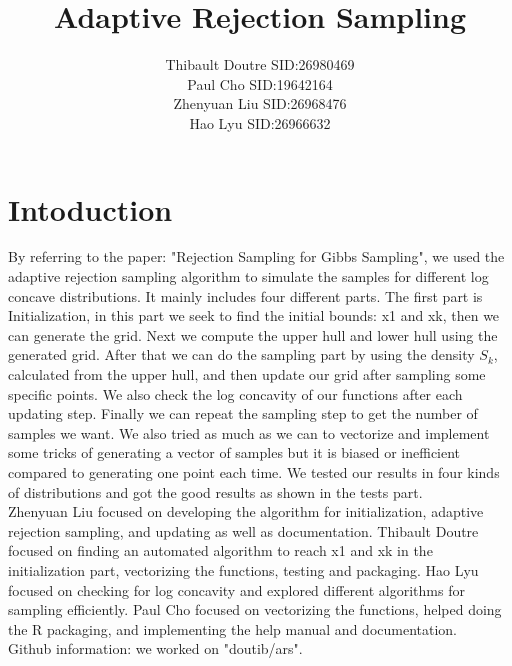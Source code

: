 \documentclass{llncs}\usepackage[]{graphicx}\usepackage[]{color}
\begin{document}
\title{Adaptive Rejection Sampling}
\author{
Thibault Doutre SID:26980469\\
Paul Cho SID:19642164\\
Zhenyuan Liu SID:26968476\\
Hao Lyu SID:26966632}
\maketitle
\section{Intoduction}
By referring to the paper: "Rejection Sampling for Gibbs Sampling", we used the adaptive rejection sampling algorithm to simulate the samples for different log concave distributions. It mainly includes four different parts. The first part is Initialization, in this part we seek to find the initial bounds: x1 and xk, then we can generate the grid. Next we compute the upper hull and lower hull using the generated grid. After that we can do the sampling part by using the density $S_k$, calculated from the upper hull, and then update our grid after sampling some specific points. We also check the log concavity of our functions after each updating step. Finally we can repeat the sampling step to get the number of samples we want. We also tried as much as we can to vectorize and implement some tricks of generating a vector of samples but it is biased or inefficient compared to generating one point each time. We tested our results in four kinds of distributions and got the good results as shown in the tests part.\\
Zhenyuan Liu focused on developing the algorithm for initialization, adaptive rejection sampling, and updating as well as documentation. Thibault Doutre focused on finding an automated algorithm to reach x1 and xk in the initialization part, vectorizing the functions, testing and packaging. Hao Lyu focused on checking for log concavity and explored different algorithms for sampling efficiently. Paul Cho focused on vectorizing the functions, helped doing the R packaging, and implementing the help manual and documentation.\\
Github information: we worked on "doutib/ars".
\end{document}
